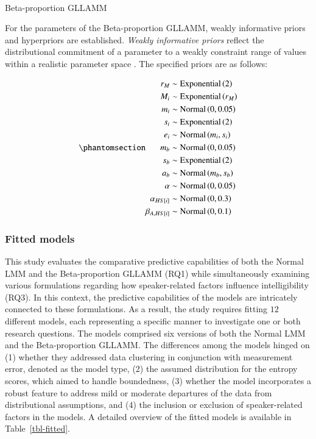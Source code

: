 \documentclass[
  authoryear,
  preprint,
  1p]{elsarticle}
\makeatletter
\let\oldparagraph\paragraph
\renewcommand{\paragraph}{
    \@ifstar
      \xxxParagraphStar
      \xxxParagraphNoStar
  }
\newcommand{\xxxParagraphStar}[1]{\oldparagraph*{#1}\mbox{}}
\newcommand{\xxxParagraphNoStar}[1]{\oldparagraph{#1}\mbox{}}
\makeatother
\begin{document}
\paragraph{Beta-proportion GLLAMM}\label{sec-M-SM-P-BGLLAMM}

For the parameters of the Beta-proportion GLLAMM, weakly informative
priors and hyperpriors are established. \emph{Weakly informative priors}
reflect the distributional commitment of a parameter to a weakly
constraint range of values within a realistic parameter space
\citep{McElreath_2020}. The specified priors are as follows:

\begin{equation}\phantomsection\label{eq-beta-GLLAMM-priors}{
\begin{aligned}
r_{M} &\sim \text{Exponential}\left( 2 \right) \\ 
M_{i} &\sim \text{Exponential}\left( r_{M} \right) \\
m_{i} &\sim \text{Normal} \left( 0, 0.05 \right) \\
s_{i} &\sim \text{Exponential} \left( 2 \right) \\
e_{i} &\sim \text{Normal} \left( m_{i}, s_{i} \right) \\
m_{b} &\sim \text{Normal} \left( 0, 0.05 \right) \\
s_{b} &\sim \text{Exponential} \left( 2 \right) \\
a_{b} &\sim \text{Normal} \left( m_{b}, s_{b} \right) \\
\alpha &\sim \text{Normal} \left( 0, 0.05 \right) \\
\alpha_{HS[i]} &\sim \text{Normal} \left( 0, 0.3 \right) \\
\beta_{A,HS[i]} &\sim \text{Normal} \left( 0, 0.1 \right)
\end{aligned} 
}\end{equation}

\subsubsection{Fitted models}\label{sec-M-SM-FM}

This study evaluates the comparative predictive capabilities of both the
Normal LMM and the Beta-proportion GLLAMM (RQ1) while simultaneously
examining various formulations regarding how speaker-related factors
influence intelligibility (RQ3). In this context, the predictive
capabilities of the models are intricately connected to these
formulations. As a result, the study requires fitting \(12\) different
models, each representing a specific manner to investigate one or both
research questions. The models comprised six versions of both the Normal
LMM and the Beta-proportion GLLAMM. The differences among the models
hinged on (1) whether they addressed data clustering in conjunction with
measurement error, denoted as the model type, (2) the assumed
distribution for the entropy scores, which aimed to handle boundedness,
(3) whether the model incorporates a robust feature to address mild or
moderate departures of the data from distributional assumptions, and (4)
the inclusion or exclusion of speaker-related factors in the models. A
detailed overview of the fitted models is available in
Table~\ref{tbl-fitted}.
\end{document}
